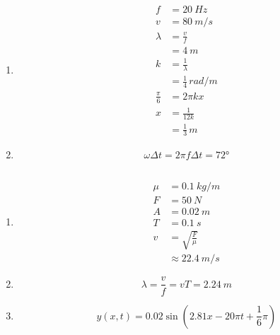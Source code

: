 \documentclass{article}
\begin{document}
\begin{enumerate}
  \item

        \begin{align*}
          f             & = \qty{20}{Hz}               \\
          v             & = \qty{80}{m/s}              \\
          \lambda       & = \frac{v}{f}                \\
                        & = \qty{4}{m}                 \\
          k             & = \frac{1}{\lambda}          \\
                        & = \frac{1}{4} \,\unit{rad/m} \\
          \frac{\pi}{6} & = 2 \pi k x                  \\
          x             & = \frac{1}{12 k}             \\
                        & = \frac{1}{3} \,\unit{m}
        \end{align*}

  \item \[\omega \Delta t = 2 \pi f \Delta t = \ang{72}\]
\end{enumerate}

\subsection{}

\begin{enumerate}
  \item

        \begin{align*}
          \mu & = \qty{0.1}{kg/m}       \\
          F   & = \qty{50}{N}           \\
          A   & = \qty{0.02}{m}         \\
          T   & = \qty{0.1}{s}          \\
          v   & = \sqrt{\frac{F}{\mu}}  \\
              & \approx \qty{22.4}{m/s}
        \end{align*}

  \item \[\lambda = \frac{v}{f} = v T = \qty{2.24}{m}\]

  \item \[y(x, t) = 0.02 \sin \left( 2.81 x - 20 \pi t + \frac{1}{6} \pi \right)\]
\end{enumerate}
\end{document}
